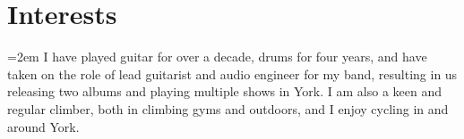 \documentclass[12pt]{article} %
\newcommand{\interests}[1]{
  \vspace*{0.5em}
  \noindent\hangindent=2em\hangafter=0 \small #1 
}
\begin{document}
\section*{Interests}
\interests{I have played guitar for over a decade, drums for four years, and have taken on the role of lead guitarist and audio engineer for my band, resulting in us releasing two albums and playing multiple shows in York. I am also a keen and regular climber, both in climbing gyms and outdoors, and I enjoy cycling in and around York.}
\end{document}

